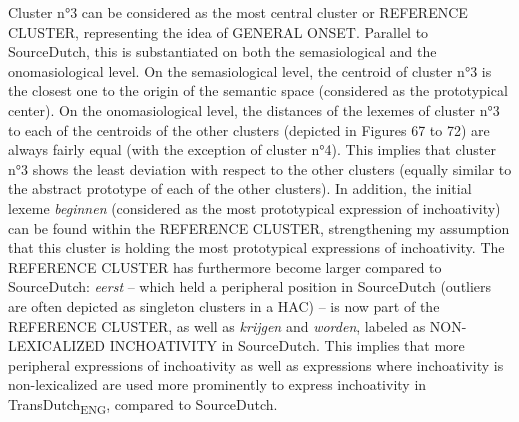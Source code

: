 Cluster n°3 can be considered as the most central cluster or REFERENCE CLUSTER, representing the idea of GENERAL ONSET. Parallel to SourceDutch, this is substantiated on both the semasiological and the onomasiological level. On the semasiological level, the centroid of cluster n°3 is the closest one to the origin of the semantic space (considered as the prototypical center). On the onomasiological level, the distances of the lexemes of cluster n°3 to each of the centroids of the other clusters (depicted in Figures 67 to 72) are always fairly equal (with the exception of cluster n°4). This implies that cluster n°3 shows the least deviation with respect to the other clusters (equally similar to the abstract prototype of each of the other clusters). In addition, the initial lexeme \textit{beginnen} (considered as the most prototypical expression of inchoativity) can be found within the REFERENCE CLUSTER, strengthening my assumption that this cluster is holding the most prototypical expressions of inchoativity. The REFERENCE CLUSTER has furthermore become larger compared to SourceDutch: \textit{eerst} – which held a peripheral position in SourceDutch (outliers are often depicted as singleton clusters in a HAC) – is now part of the REFERENCE CLUSTER, as well as \textit{krijgen} and \textit{worden}, labeled as {NON-LEXICALIZED INCHOATIVITY} in SourceDutch. This implies that more peripheral expressions of inchoativity as well as expressions where inchoativity is non-lexicalized are used more prominently to express inchoativity in TransDutch\textsubscript{ENG}, compared to SourceDutch.

